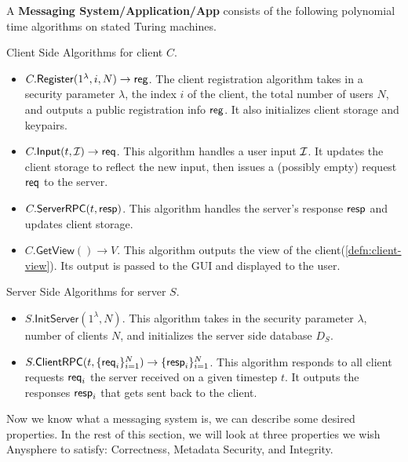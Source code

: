 \begin{definition}
\label{defn:messaging-scheme}
A \textbf{Messaging System/Application/App} consists of the following polynomial time algorithms on stated Turing machines.

Client Side Algorithms for client $C$.
\begin{itemize}
    \item $C.\mathsf{Register}(1^{\lambda}, i, N) \to \mathsf{reg}$. The client registration algorithm takes in a security parameter $\lambda$, the index $i$ of the client, the total number of users $N$, and outputs a public registration info $\mathsf{reg}$. It also initializes client storage and keypairs.
    
    \item $C.\mathsf{Input}(t, \mathcal{I}) \to \mathsf{req}$. This algorithm handles a user input $\mathcal{I}$. It updates the client storage to reflect the new input, then issues a (possibly empty) request $\mathsf{req}$ to the server.
    
    \item $C.\mathsf{ServerRPC}(t, \mathsf{resp})$. This algorithm handles the server's response $\mathsf{resp}$ and updates client storage.
    
    \item $C.\mathsf{GetView}() \to V$. This algorithm outputs the view of the client(\cref{defn:client-view}). Its output is passed to the GUI and displayed to the user.
\end{itemize}

Server Side Algorithms for server $S$.

\begin{itemize}
    \item $S.\mathsf{InitServer}(1^{\lambda}, N)$. This algorithm takes in the security parameter $\lambda$, number of clients $N$, and initializes the server side database $D_S$.
    \item $S.\mathsf{ClientRPC}(t, \{\mathsf{req}_i\}_{i = 1}^N) \to \{\mathsf{resp}_i\}_{i = 1}^N$. This algorithm responds to all client requests $\mathsf{req}_i$ the server received on a given timestep $t$. It outputs the responses $\mathsf{resp}_i$ that gets sent back to the client.
\end{itemize}
\end{definition}


Now we know what a messaging system is, we can describe some desired properties. In the rest of this section, we will look at three properties we wish Anysphere to satisfy: Correctness, Metadata Security, and Integrity.

